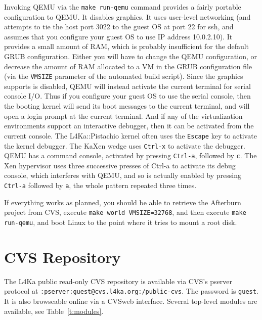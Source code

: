 \documentclass[twoside,a4paper]{report}
\newcommand{\code}[1]{{\tt #1}}
\newcommand{\cmd}[1]{\code{#1}}
\begin{document}
Invoking QEMU via the \cmd{make run-qemu} command provides a fairly portable
configuration to QEMU.  It disables graphics.  It uses user-level
networking (and attempts to tie the host port 3022 to the
guest OS at port 22 for ssh, and assumes that you configure your guest OS to
use IP address 10.0.2.10).  It provides a small amount of RAM, which
is probably insufficient for the default GRUB configuration.  Either
you will have to change the QEMU configuration, or decrease the amount
of RAM allocated to a VM in the GRUB configuration file (via the
\code{VMSIZE} parameter of the automated build script).
Since the graphics supports is disabled, QEMU will instead 
activate the current terminal for serial console
I/O.  Thus if you configure your guest OS to use the serial console,
then the booting kernel will send its boot messages to the current
terminal, and will open a login prompt at the current terminal.  And
if any of the virtualization environments support an interactive
debugger, then it can be activated from the current console.  The
L4Ka::Pistachio kernel often uses the \cmd{Escape} key to activate the
kernel debugger.  The KaXen wedge uses \cmd{Ctrl-x} to activate the
debugger.  QEMU has a command console, activated by pressing
\cmd{Ctrl-a}, followed by \cmd{c}. The Xen hypervisor uses three successive 
presses of Ctrl-a to activate its debug console, which interferes with
QEMU, and so is actually enabled by pressing \cmd{Ctrl-a} followed by
\cmd{a}, the whole pattern repeated three times.

If everything works as planned, you should be able to retrieve the
Afterburn project from CVS, execute \cmd{make world VMSIZE=32768}, and 
then execute \cmd{make run-qemu}, and boot Linux to the point where it tries to
mount a root disk.



%
%

\appendix

\chapter{CVS Repository}
\label{a:cvs}

The L4Ka public read-only CVS repository is available via CVS's
pserver protocol at \code{:pserver:guest@cvs.l4ka.org:/public-cvs}.
The password is \code{guest}.  It is also browseable online via a
CVSweb interface.  Several top-level modules are available, see
Table~\ref{t:modules}.
\end{document}

